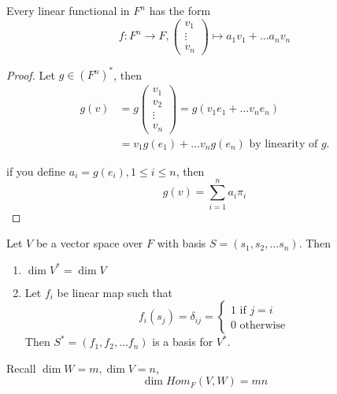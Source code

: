 \begin{remark}
    Every linear functional in $F^n$ has the form
    \[
        f : F^n \to F, \begin{pmatrix} v_1 \\ \vdots \\ v_n \end{pmatrix}  \mapsto a_1v_1 + \hdots a_n v_n
    \]
\end{remark}
\begin{proof}
    Let $g \in (F^n)^*$, then 
    \begin{align*}
        g(v) &= g \begin{pmatrix} v_1 \\ v_2 \\ \vdots \\ v_n \end{pmatrix}  = g( v_1 e_1 + \hdots v_n e_n) \\
        &= v_1 g(e_1) + \hdots v_n g(e_n) \text{ by linearity of $g$}. 
    \end{align*}

    if you define $a_i = g(e_i), 1 \leq i \leq n$, then 
    \[
        g(v) = \sum\limits_{i = 1}^{n}  a_i \pi_i
    \]
\end{proof}

\begin{theorem}
    Let $V$ be a vector space over $F$ with basis $S = (s_1, s_2, \hdots s_n)$. Then 
    \begin{enumerate}
        \item $\dim V^* = \dim V$ 
        \item Let $f_i$ be linear map such that 
        \[
            f_i (s_j) = \delta_{ij } = \begin{cases}
                1 \text{ if } j = i \\
                0 \text{ otherwise}
            \end{cases}
        \]
        Then $S^* = (f_1, f_2, \hdots f_n)$ is a basis for $V^*$.
    \end{enumerate} 
\end{theorem}

\begin{remark}
    Recall $\dim W = m, \dim V = n$, 
    \[
        \dim Hom_F(V, W) = mn
    \]
\end{remark}


